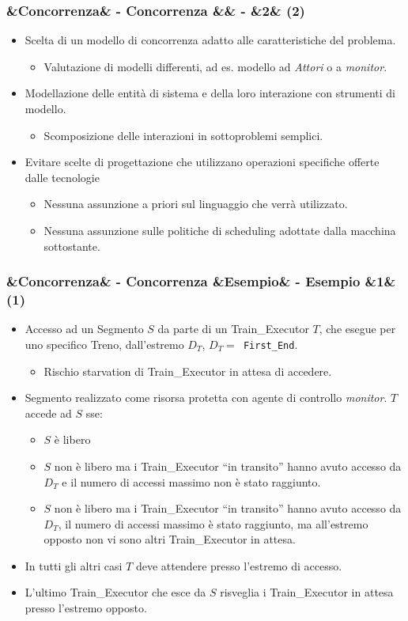 \documentclass[slidestop,compress,blackandwhite]{beamer}
\newcommand{\ttt}[1]{\texttt{#1}}
\newcommand{\ii}[1]{\textit{#1}}
\newcommand{\cm}[1]{\vspace{#1cm}}
\newcommand{\newtitle}[4]{
	#1 
	\ifx&#2&%
	\else
  		\large- #2
	\fi
	\ifx&#3&%
	\else
  		\small- #3
	\fi
	\ifx&#4&%
	\else
  		\normalsize (#4)
	\fi
}
\newcommand{\newframe}[5]{
	\begin{frame}
		\frametitle{\newtitle{#1}{#2}{#3}{#4}}
		#5
	\end{frame}
}
\newcommand{\myitemize}[1]{
	\begin{itemize}\itemsep4pt
	#1
	\end{itemize}
}
\begin{document}
	
	\newframe{}{Concorrenza}{}{2}{
		\justifying
		\cm{0.5}
		\myitemize {
			\item Scelta di un modello di concorrenza adatto alle caratteristiche del problema.
				\myitemize{
					\item Valutazione di modelli differenti, ad es. modello ad \ii{Attori} o a \ii{monitor}.
				}
			\item Modellazione delle entità di sistema e della loro interazione con strumenti di modello.
				\myitemize {
					\item Scomposizione delle interazioni in sottoproblemi semplici.
				}
			\item Evitare scelte di progettazione che utilizzano operazioni specifiche offerte dalle tecnologie
				\myitemize {
					\item Nessuna assunzione a priori sul linguaggio che verrà utilizzato.
					\item Nessuna assunzione sulle politiche di scheduling adottate dalla macchina sottostante.
				}
		}
		
	}
	
	\newframe{}{Concorrenza}{Esempio}{1}{
		\cm{-0.1}
		\footnotesize
		\myitemize {
			\item Accesso ad un Segmento $S$ da parte di un Train\_Executor $T$, che esegue per uno specifico Treno, dall'estremo $D_T$, $D_T=$\ttt{ First\_End}.
				\myitemize {
					\item \footnotesize Rischio starvation di Train\_Executor in attesa di accedere.
				}
			\item Segmento realizzato come risorsa protetta con agente di controllo \ii{monitor}. $T$ accede ad $S$ sse:
				\myitemize{
					\item \footnotesize $S$ è libero
					\item $S$ non è libero ma i Train\_Executor ``in transito'' hanno avuto accesso da $D_T$ e il numero di accessi massimo non è stato raggiunto.
					\item $S$ non è libero ma i Train\_Executor ``in transito'' hanno avuto accesso da $D_T$, il numero di accessi massimo è stato raggiunto, ma all'estremo opposto non vi sono altri Train\_Executor in attesa.
				}
			\item In tutti gli altri casi $T$ deve attendere presso l'estremo di accesso.
			\item L'ultimo Train\_Executor che esce da $S$ risveglia i Train\_Executor in attesa presso l'estremo opposto.
		}	
	}
	
\end{document}
